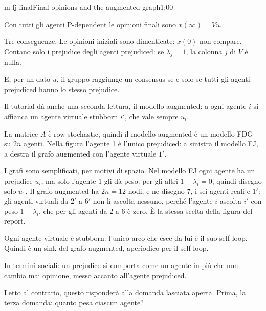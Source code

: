 \begin{slide}{m-fj-final}{Final opinions and the augmented graph}{1:00}
  \begin{discorso}
    \item Con tutti gli agenti P-dependent le opinioni finali sono $x(\infty)=Vu$.
    \item Tre conseguenze. Le opinioni iniziali sono dimenticate: $x(0)$ non compare. Contano solo i prejudice degli agenti prejudiced: se $\lambda_j=1$, la colonna $j$ di $V$ è nulla.
    \item E, per un dato $u$, il gruppo raggiunge un consensus se e solo se tutti gli agenti prejudiced hanno lo stesso prejudice.
    \item Il tutorial dà anche una seconda lettura, il modello augmented: a ogni agente $i$ si affianca un agente virtuale stubborn $i'$, che vale sempre $u_i$.
    \item La matrice $\bar A$ è row-stochastic, quindi il modello augmented è un modello FDG su $2n$ agenti. Nella figura l'agente 1 è l'unico prejudiced: a sinistra il modello FJ, a destra il grafo augmented con l'agente virtuale $1'$.
    \item I grafi sono semplificati, per motivi di spazio. Nel modello FJ ogni agente ha un prejudice $u_i$, ma solo l'agente 1 gli dà peso: per gli altri $1-\lambda_i=0$, quindi disegno solo $u_1$. Il grafo augmented ha $2n=12$ nodi, e ne disegno 7, i sei agenti reali e $1'$: gli agenti virtuali da $2'$ a $6'$ non li ascolta nessuno, perché l'agente $i$ ascolta $i'$ con peso $1-\lambda_i$, che per gli agenti da 2 a 6 è zero. È la stessa scelta della figura del report.
    \item Ogni agente virtuale è stubborn: l'unico arco che esce da lui è il suo self-loop. Quindi è un sink del grafo augmented, aperiodico per il self-loop.
    \item In termini sociali: un prejudice si comporta come un agente in più che non cambia mai opinione, messo accanto all'agente prejudiced.
    \item Letto al contrario, questo risponderà alla domanda lasciata aperta. Prima, la terza domanda: quanto pesa ciascun agente?
  \end{discorso}
\end{slide}

